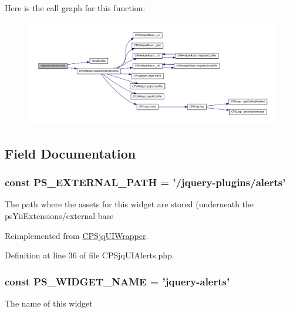 Here is the call graph for this function:\nopagebreak
\begin{figure}[H]
\begin{center}
\leavevmode
\includegraphics[width=400pt]{classCPSjqUIAlerts_ac02a66bde8e72e4909137bf748edf665_cgraph}
\end{center}
\end{figure}




\subsection{Field Documentation}
\hypertarget{classCPSjqUIAlerts_a8ccb5e1d65c091f944a6aa8c5be834ca}{
\subsubsection[{PS\_\-EXTERNAL\_\-PATH}]{\setlength{\rightskip}{0pt plus 5cm}const {\bf PS\_\-EXTERNAL\_\-PATH} = '/jquery-\/plugins/alerts'}}
\label{classCPSjqUIAlerts_a8ccb5e1d65c091f944a6aa8c5be834ca}
The path where the assets for this widget are stored (underneath the psYiiExtensions/external base 

Reimplemented from \hyperlink{classCPSjqUIWrapper_a8ccb5e1d65c091f944a6aa8c5be834ca}{CPSjqUIWrapper}.



Definition at line 36 of file CPSjqUIAlerts.php.

\hypertarget{classCPSjqUIAlerts_ae357f9dc377f7de0d12010b2ced28cbc}{
\subsubsection[{PS\_\-WIDGET\_\-NAME}]{\setlength{\rightskip}{0pt plus 5cm}const {\bf PS\_\-WIDGET\_\-NAME} = 'jquery-\/alerts'}}
\label{classCPSjqUIAlerts_ae357f9dc377f7de0d12010b2ced28cbc}
The name of this widget 

